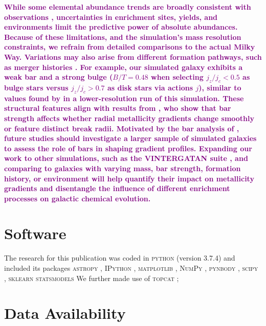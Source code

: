 \documentclass[twocolumn,apj,numberedappendix,appendixfloats,twocolappendix]{openjournal}
\newcommand{\adjusted}[1]{\textbf{\textcolor{purple}{#1}}}
\begin{document}
\begin{CJK*}{UTF8}{gbsn}
\adjusted{While some elemental abundance trends are broadly consistent with observations \citep{Buck2021, Buder2024}, uncertainties in enrichment sites, yields, and environments limit the predictive power of absolute abundances. Because of these limitations, and the simulation’s mass resolution constraints, we refrain from detailed comparisons to the actual Milky Way. Variations may also arise from different formation pathways, such as merger histories \citep{Buck2023, Buder2024}. For example, our simulated galaxy exhibits a weak bar and a strong bulge ($B/T = 0.48$ when selecting $j_z/j_c < 0.5$ as bulge stars versus $j_z/j_c > 0.7$ as disk stars via actions $j$), similar to values found by \citet{Obreja2019} in a lower-resolution run of this simulation. These structural features align with results from \citet{Chen2023}, who show that bar strength affects whether radial metallicity gradients change smoothly or feature distinct break radii. Motivated by the bar analysis of \citet{Tuntipong2024}, future studies should investigate a larger sample of simulated galaxies to assess the role of bars in shaping gradient profiles. Expanding our work to other simulations, such as the \textsc{VINTERGATAN} suite \citep{Renaud2024}, and comparing to galaxies with varying mass, bar strength, formation history, or environment will help quantify their impact on metallicity gradients and disentangle the influence of different enrichment processes on galactic chemical evolution.}

\section*{Software}

The research for this publication was coded in \textsc{python} (version 3.7.4) and included its packages
\textsc{astropy} \citep[v. 3.2.2;][]{Robitaille2013,PriceWhelan2018},
\textsc{IPython} \citep[v. 7.8.0;][]{ipython},
\textsc{matplotlib} \citep[v. 3.1.3;][]{matplotlib},
\textsc{NumPy} \citep[v. 1.17.2;][]{numpy},
\textsc{pynbody} \citep[v. 1.1.0;][]{pynbody},
\textsc{scipy} \citep[v. 1.3.1;][]{Scipy},
\textsc{sklearn} \citep[v. 1.5.1][]{scikit-learn}
\textsc{statsmodels} \citep[v. 0.14.2][]{statsmodels}
We further made use of \textsc{topcat} \citep[version 4.7;][]{Taylor2005};

\section*{Data Availability}


\end{CJK*}
\end{document}
